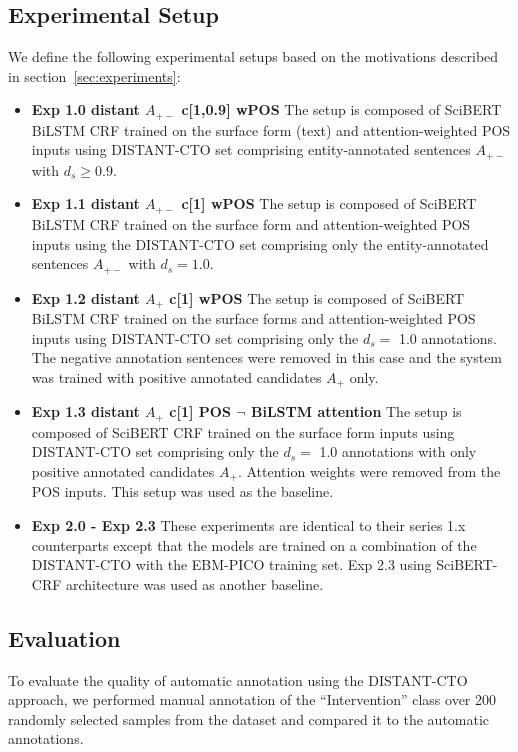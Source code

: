 \documentclass[11pt]{article}
\begin{document}
\subsection{Experimental Setup}
\label{subsec:expsetup}
%
We define the following experimental setups based on the motivations described in section~\ref{sec:experiments}:
\begin{itemize}
\item \textbf{Exp 1.0 distant $A_{+-}$ c[1,0.9] wPOS} The setup is composed of SciBERT BiLSTM CRF trained on the surface form (text) and attention-weighted POS inputs using DISTANT-CTO set comprising entity-annotated sentences $A_{+-}$ with $d_s \geq 0.9$.
    \item \textbf{Exp 1.1 distant $A_{+-}$ c[1] wPOS} The setup is composed of SciBERT BiLSTM CRF trained on the surface form and attention-weighted POS inputs using the DISTANT-CTO set comprising only the entity-annotated sentences $A_{+-}$ with $d_s = 1.0$.
    \item \textbf{Exp 1.2 distant $A_{+}$ c[1] wPOS} The setup is composed of SciBERT BiLSTM CRF trained on the surface forms and attention-weighted POS inputs using DISTANT-CTO set comprising only the $d_s =$ 1.0 annotations. The negative annotation sentences were removed in this case and the system was trained with positive annotated candidates $A_{+}$ only.
    \item \textbf{Exp 1.3 distant $A_{+}$ c[1] POS $\neg$ BiLSTM attention } The setup is composed of SciBERT CRF trained on the surface form inputs using DISTANT-CTO set comprising only the $d_s =$ 1.0 annotations with only positive annotated candidates $A_{+}$. Attention weights were removed from the POS inputs. This setup was used as the baseline.
    \item \textbf{Exp 2.0 - Exp 2.3 } These experiments are identical to their series 1.x counterparts except that the models are trained on a combination of the DISTANT-CTO with the EBM-PICO training set. Exp 2.3 using SciBERT-CRF architecture was used as another baseline.
\end{itemize}
%
%
%
\subsection{Evaluation}
\label{subsec:eval}
%
To evaluate the quality of automatic annotation using the DISTANT-CTO approach, we performed manual annotation of the ``Intervention'' class over 200 randomly selected samples from the dataset and compared it to the automatic annotations.
\end{document}
